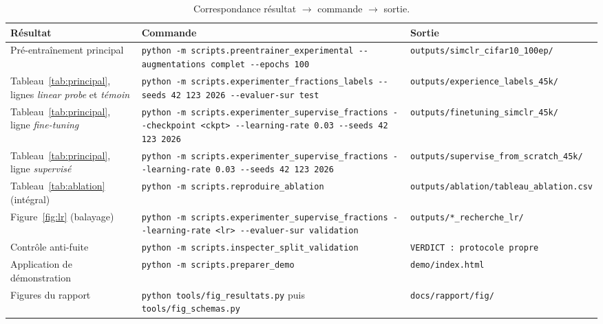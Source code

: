 \documentclass[11pt,a4paper]{article}
\newcommand{\brk}{\discretionary{}{}{}}
\newcommand{\cmd}[1]{\texttt{\small #1}}
\begin{document}
\begin{table}[htbp]
\centering\small
\caption{Correspondance résultat $\rightarrow$ commande $\rightarrow$ sortie.}
\begin{tabularx}{\textwidth}{@{}p{3.2cm}>{\raggedright\arraybackslash}X>{\raggedright\arraybackslash}p{3.3cm}@{}}
\toprule
\textbf{Résultat} & \textbf{Commande} & \textbf{Sortie} \\
\midrule
Pré-entraînement principal & \cmd{python -\brk{}m scripts.\brk{}preentrainer\_\brk{}experimental -\brk{}-\brk{}augmentations complet -\brk{}-\brk{}epochs 100} & \cmd{outputs/\brk{}simclr\_\brk{}cifar10\_\brk{}100ep/\brk{}} \\
\addlinespace
Tableau~\ref{tab:principal}, lignes \emph{linear probe} et \emph{témoin} & \cmd{python -\brk{}m scripts.\brk{}experimenter\_\brk{}fractions\_\brk{}labels -\brk{}-\brk{}seeds 42 123 2026 -\brk{}-\brk{}evaluer-\brk{}sur test} & \cmd{outputs/\brk{}experience\_\brk{}labels\_\brk{}45k/\brk{}} \\
\addlinespace
Tableau~\ref{tab:principal}, ligne \emph{fine-tuning} & \cmd{python -\brk{}m scripts.\brk{}experimenter\_\brk{}supervise\_\brk{}fractions -\brk{}-\brk{}checkpoint <ckpt> -\brk{}-\brk{}learning-\brk{}rate 0.\brk{}03 -\brk{}-\brk{}seeds 42 123 2026} & \cmd{outputs/\brk{}finetuning\_\brk{}simclr\_\brk{}45k/\brk{}} \\
\addlinespace
Tableau~\ref{tab:principal}, ligne \emph{supervisé} & \cmd{python -\brk{}m scripts.\brk{}experimenter\_\brk{}supervise\_\brk{}fractions -\brk{}-\brk{}learning-\brk{}rate 0.\brk{}03 -\brk{}-\brk{}seeds 42 123 2026} & \cmd{outputs/\brk{}supervise\_\brk{}from\_\brk{}scratch\_\brk{}45k/\brk{}} \\
\addlinespace
Tableau~\ref{tab:ablation} (intégral) & \cmd{python -\brk{}m scripts.\brk{}reproduire\_\brk{}ablation} & \cmd{outputs/\brk{}ablation/\brk{}tableau\_\brk{}ablation.\brk{}csv} \\
\addlinespace
Figure~\ref{fig:lr} (balayage) & \cmd{python -\brk{}m scripts.\brk{}experimenter\_\brk{}supervise\_\brk{}fractions -\brk{}-\brk{}learning-\brk{}rate <lr> -\brk{}-\brk{}evaluer-\brk{}sur validation} & \cmd{outputs/\brk{}*\_\brk{}recherche\_\brk{}lr/\brk{}} \\
\addlinespace
Contrôle anti-fuite & \cmd{python -\brk{}m scripts.\brk{}inspecter\_\brk{}split\_\brk{}validation} & \cmd{VERDICT : protocole propre} \\
\addlinespace
Application de démonstration & \cmd{python -\brk{}m scripts.\brk{}preparer\_\brk{}demo} & \cmd{demo/\brk{}index.\brk{}html} \\
\addlinespace
Figures du rapport & \cmd{python tools/\brk{}fig\_\brk{}resultats.\brk{}py} puis \cmd{tools/\brk{}fig\_\brk{}schemas.\brk{}py} & \cmd{docs/\brk{}rapport/\brk{}fig/\brk{}} \\
\bottomrule
\end{tabularx}
\end{table}
\end{document}
